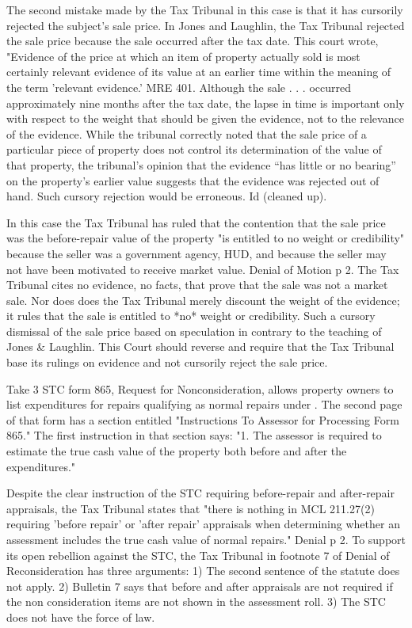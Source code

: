 The second mistake made by the Tax Tribunal in this case is that it has cursorily rejected the subject's sale price. In Jones and Laughlin, the Tax Tribunal rejected the sale price because the sale occurred after the tax date. This court wrote, "Evidence of the price at which an item of property actually sold is most
certainly relevant evidence of its value at an earlier time within the meaning
of the term ’relevant evidence.’ MRE 401. Although the sale . . . occurred
approximately nine months after the tax date, the lapse in time is important
only with respect to the weight that should be given the evidence, not to the
relevance of the evidence. While the tribunal correctly noted that the sale
price of a particular piece of property does not control its determination of
the value of that property, the tribunal’s opinion that the evidence “has little
or no bearing” on the property’s earlier value suggests that the evidence
was rejected out of hand. Such cursory rejection would be erroneous. Id
(cleaned up).

In this case the Tax Tribunal has ruled that the contention that the sale price was the before-repair value of the property "is entitled to no weight or credibility" because the seller was a government agency, HUD, and because the seller may not have been motivated to receive market value. Denial of Motion p 2. The Tax Tribunal cites no evidence, no facts, that prove that the sale was not a market sale. Nor does does the Tax Tribunal merely discount the weight of the evidence; it rules that the sale is entitled to *no* weight or credibility. Such a cursory dismissal of the sale price based on speculation in contrary to the teaching of Jones & Laughlin. This Court should reverse and require that the Tax Tribunal base its rulings on evidence and not cursorily reject the sale price. 

Take 3
STC form 865, Request for Nonconsideration, allows property owners to list expenditures for repairs qualifying as normal repairs under \mathieuGast. The second page of that form has a section entitled "Instructions To Assessor for Processing Form 865." The first instruction in that section says: "1. The assessor is required to estimate the true cash value of the property both before and after the expenditures." 

Despite the clear instruction of the STC requiring before-repair and after-repair appraisals, the Tax Tribunal states that "there is nothing in MCL 211.27(2) requiring 'before repair' or 'after repair' appraisals when determining whether an assessment includes the true cash value of normal repairs." Denial p 2. To support its open rebellion against the STC,  the Tax Tribunal in footnote 7 of Denial of Reconsideration has three arguments: 1) The second sentence of the statute does not apply. 2) Bulletin 7 says that before and after appraisals are not required if the non consideration items are not shown in the assessment roll. 3) The STC does not have the force of law. 

